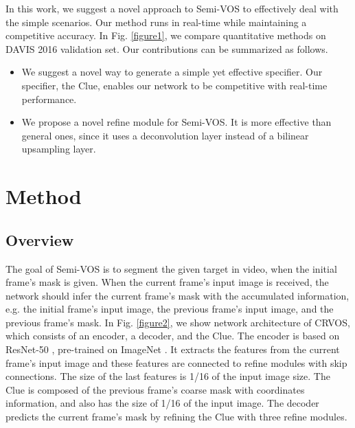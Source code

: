 \documentclass{article}
\begin{document}
In this work, we suggest a novel approach to Semi-VOS to effectively deal with the simple scenarios. Our method runs in real-time while maintaining a competitive accuracy. In Fig. \ref{figure1}, we compare quantitative methods on DAVIS 2016 \cite{perazzi2016benchmark} validation set. Our contributions can be summarized as follows.


\begin{itemize}
	\setlength{\itemsep}{0.5em}
	\setlength{\parskip}{0pt}
	\item We suggest a novel way to generate a simple yet effective specifier. Our specifier, the Clue, enables our network to be competitive with real-time performance. 
	\item We propose a novel refine module for Semi-VOS. It is more effective than general ones, since it uses a deconvolution layer instead of a bilinear upsampling layer. 
\end{itemize}




\section{Method}\label{method}
\subsection{Overview} 
The goal of Semi-VOS is to segment the given target in video, when the initial frame's mask is given. When the current frame's input image is received, the network should infer the current frame's mask with the accumulated information, e.g. the initial frame's input image, the previous frame's input image, and the previous frame's mask. In Fig. \ref{figure2}, we show network architecture of CRVOS, which consists of an encoder, a decoder, and the Clue. The encoder is based on ResNet-50 \cite{he2016deep}, pre-trained on ImageNet \cite{deng2009imagenet}. It extracts the features from the current frame's input image and these features are connected to refine modules with skip connections. The size of the last features is 1/16 of the input image size. The Clue is composed of the previous frame's coarse mask with coordinates information, and also has the size of 1/16 of the input image. The decoder predicts the current frame's mask by refining the Clue with three refine modules. 
\end{document}
